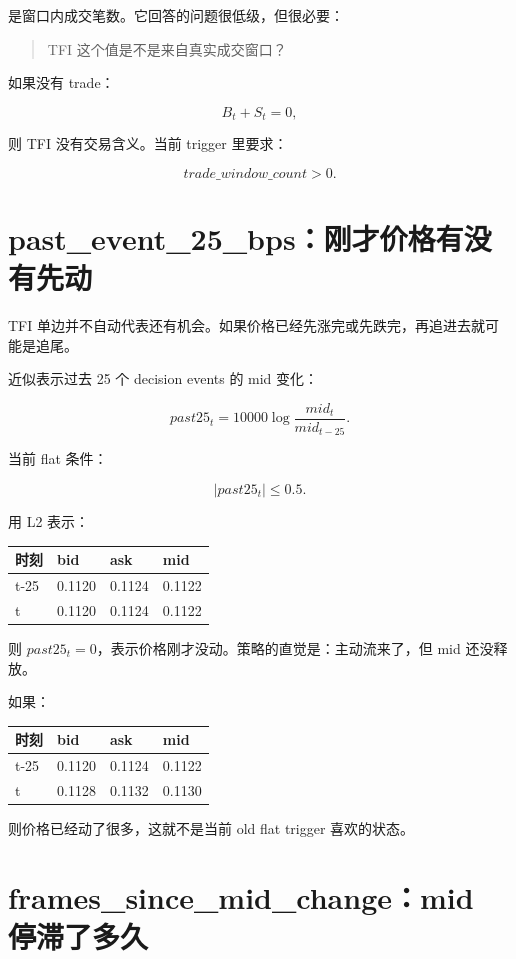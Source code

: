  是窗口内成交笔数。它回答的问题很低级，但很必要：

\begin{quote}
TFI 这个值是不是来自真实成交窗口？
\end{quote}

如果没有 trade：

\[
B_t+S_t=0,
\]

则 TFI 没有交易含义。当前 trigger 里要求：

\[
trade\_window\_count>0.
\]

\section{past\_event\_25\_bps：刚才价格有没有先动}

TFI 单边并不自动代表还有机会。如果价格已经先涨完或先跌完，再追进去就可能是追尾。

 近似表示过去 25 个 decision events 的 mid 变化：

\[
past25_t=10000\log\frac{mid_t}{mid_{t-25}}.
\]

当前 flat 条件：

\[
|past25_t|\le0.5.
\]

用 L2 表示：

\begin{longtable}{p{}p{}p{}p{}}
\toprule
时刻 & bid & ask & mid \\
\midrule
t-25 & 0.1120 & 0.1124 & 0.1122 \\
t & 0.1120 & 0.1124 & 0.1122 \\
\bottomrule
\end{longtable}

则 \(past25_t=0\)，表示价格刚才没动。策略的直觉是：主动流来了，但 mid 还没释放。

如果：

\begin{longtable}{p{}p{}p{}p{}}
\toprule
时刻 & bid & ask & mid \\
\midrule
t-25 & 0.1120 & 0.1124 & 0.1122 \\
t & 0.1128 & 0.1132 & 0.1130 \\
\bottomrule
\end{longtable}

则价格已经动了很多，这就不是当前 old flat trigger 喜欢的状态。

\section{frames\_since\_mid\_change：mid 停滞了多久}

